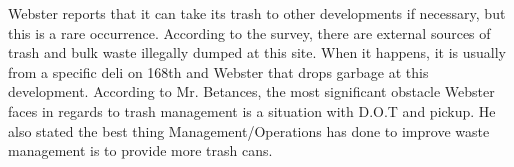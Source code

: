 Webster reports that it can take its trash to other developments if necessary, but this is a rare occurrence.  According to the survey, there are external sources of trash and bulk waste illegally dumped at this site. When it happens, it is usually from a specific deli on 168th and Webster that drops garbage at this development. According to Mr. Betances, the most significant obstacle Webster faces in regards to trash management is a situation with D.O.T and pickup. He also stated the best thing Management/Operations has done to improve waste management is to provide more trash cans.  